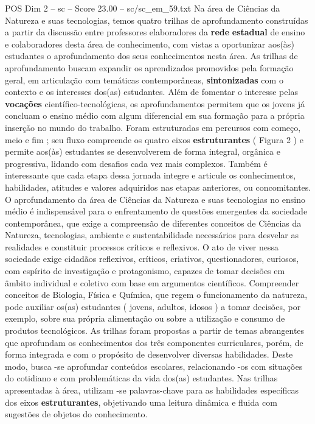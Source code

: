 \begin{textsample}{POS Dim 2 – sc – Score 23.00 – sc/sc\_em\_59.txt}
Na área de Ciências da Natureza e suas tecnologias, temos quatro trilhas de aprofundamento construídas a partir da discussão entre professores elaboradores da \textbf{rede} \textbf{estadual} de ensino e colaboradores desta área de conhecimento, com vistas a oportunizar aos(às) estudantes o aprofundamento dos seus conhecimentos nesta área.
As trilhas de aprofundamento buscam expandir os aprendizados promovidos pela formação geral, em articulação com temáticas contemporâneas, \textbf{sintonizadas} com o contexto e os interesses dos(as) estudantes.
Além de fomentar o interesse pelas \textbf{vocações} científico-tecnológicas, os aprofundamentos permitem que os jovens já concluam o ensino médio com algum diferencial em sua formação para a própria inserção no mundo do trabalho.
Foram estruturadas em percursos com começo, meio e fim ; seu fluxo compreende os quatro eixos \textbf{estruturantes} ( Figura 2 ) e permite aos(às) estudantes se desenvolverem de forma integral, orgânica e progressiva, lidando com desafios cada vez mais complexos.
Também é interessante que cada etapa dessa jornada integre e articule os conhecimentos, habilidades, atitudes e valores adquiridos nas etapas anteriores, ou concomitantes.
O aprofundamento da área de Ciências da Natureza e suas tecnologias no ensino médio é indispensável para o enfrentamento de questões emergentes da sociedade contemporânea, que exige a compreensão de diferentes conceitos de Ciências da Natureza, tecnologias, ambiente e sustentabilidade necessários para desvelar as realidades e constituir processos críticos e reflexivos.
O ato de viver nessa sociedade exige cidadãos reflexivos, críticos, criativos, questionadores, curiosos, com espírito de investigação e protagonismo, capazes de tomar decisões em âmbito individual e coletivo com base em argumentos científicos.
Compreender conceitos de Biologia, Física e Química, que regem o funcionamento da natureza, pode auxiliar os(as) estudantes ( jovens, adultos, idosos ) a tomar decisões, por exemplo, sobre sua própria alimentação ou sobre a utilização e consumo de produtos tecnológicos.
As trilhas foram propostas a partir de temas abrangentes que aprofundam os conhecimentos dos três componentes curriculares, porém, de forma integrada e com o propósito de desenvolver diversas habilidades.
Deste modo, busca -se aprofundar conteúdos escolares, relacionando -os com situações do cotidiano e com problemáticas da vida dos(as) estudantes.
Nas trilhas apresentadas à área, utilizam -se palavras-chave para as habilidades específicas dos eixos \textbf{estruturantes}, objetivando uma leitura dinâmica e fluida com sugestões de objetos do conhecimento.

\end{textsample}
